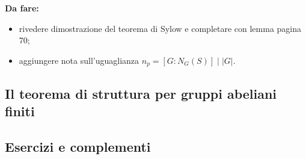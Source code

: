 \documentclass[11pt]{scrartcl}
\theoremstyle{style1}
\numberwithin{equation}{subsection}
\renewcommand{\textbf}[1]{\textsf{\bfseries #1}}
\begin{document}
\textbf{Da fare:}
\begin{itemize}
	\item rivedere dimostrazione del teorema di Sylow e completare con lemma pagina 70;
	\item aggiungere nota sull'uguaglianza $n_p = [G:N_G(S)]  \mid  |G|$.
\end{itemize}












\subsection{Il teorema di struttura per gruppi abeliani finiti}













\subsection{Esercizi e complementi}
\end{document}
